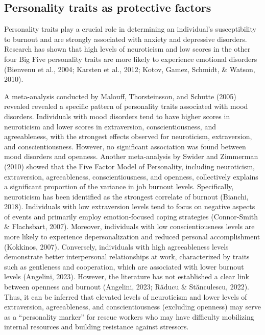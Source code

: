 \documentclass[
  man]{apa7}
\begin{document}
\hypertarget{personality-traits-as-protective-factors}{%
\subsection{Personality traits as protective factors}\label{personality-traits-as-protective-factors}}

Personality traits play a crucial role in determining an individual's susceptibility to burnout and are strongly associated with anxiety and depressive disorders. Research has shown that high levels of neuroticism and low scores in the other four Big Five personality traits are more likely to experience emotional disorders (Bienvenu et al., 2004; Karsten et al., 2012; Kotov, Gamez, Schmidt, \& Watson, 2010).

A meta-analysis conducted by Malouff, Thorsteinsson, and Schutte (2005) revealed revealed a specific pattern of personality traits associated with mood disorders. Individuals with mood disorders tend to have higher scores in neuroticism and lower scores in extraversion, conscientiousness, and agreeableness, with the strongest effects observed for neuroticism, extraversion, and conscientiousness. However, no significant association was found between mood disorders and openness. Another meta-analysis by Swider and Zimmerman (2010) showed that the Five Factor Model of Personality, including neuroticism, extraversion, agreeableness, conscientiousness, and openness, collectively explains a significant proportion of the variance in job burnout levels. Specifically, neuroticism has been identified as the strongest correlate of burnout (Bianchi, 2018). Individuals with low extraversion levels tend to focus on negative aspects of events and primarily employ emotion-focused coping strategies (Connor-Smith \& Flachsbart, 2007). Moreover, individuals with low conscientiousness levels are more likely to experience depersonalization and reduced personal accomplishment (Kokkinos, 2007). Conversely, individuals with high agreeableness levels demonstrate better interpersonal relationships at work, characterized by traits such as gentleness and cooperation, which are associated with lower burnout levels (Angelini, 2023). However, the literature has not established a clear link between openness and burnout (Angelini, 2023; Răducu \& Stănculescu, 2022). Thus, it can be inferred that elevated levels of neuroticism and lower levels of extraversion, agreeableness, and conscientiousness (excluding openness) may serve as a ``personality marker'' for rescue workers who may have difficulty mobilizing internal resources and building resistance against stressors.
\end{document}

